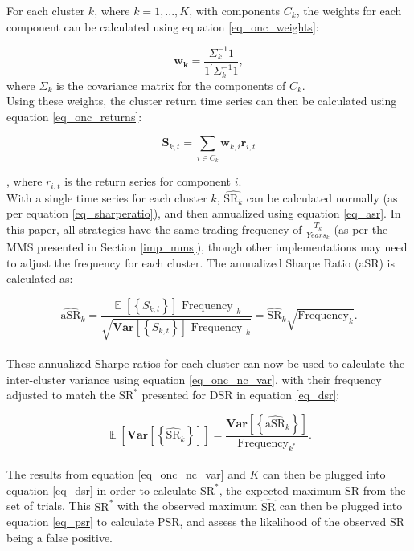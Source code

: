 \documentclass[a4paper,11pt,oneside]{article}
\newcommand{\Var}{\mathbf{Var}}
\DeclareMathOperator*{\E}{\mathbb{E}}
\theoremstyle{plain}
\theoremstyle{definition}
\begin{document}
	For each cluster $k$, where $k = 1, ..., K$, with components $C_k$, the weights for each component can be calculated using equation \eqref{eq_onc_weights}:
	
	\begin{equation}\label{eq_onc_weights}
	\mathbf{w_{k}}=\frac{\Sigma_{k}^{-1} 1}{1^{\prime} \Sigma_{k}^{-1} 1}, 
	\end{equation}
		where $\Sigma_k$ is the covariance matrix for the components of $C_k$.\newline
	~\\
	Using these weights, the cluster return time series can then be calculated using equation \eqref{eq_onc_returns}:
	
	\begin{equation}\label{eq_onc_returns}
	\mathbf{S}_{k, t}=\sum_{i \in C_{k}} \mathbf{w}_{k, i} \mathbf{r}_{i, t}
	\end{equation}

	, where $r_{i,t}$ is the return series for component $i$.\newline
	~\\
	With a single time series for each cluster $k$, $\widehat{\mathrm{SR}_k}$ can be calculated normally (as per equation \eqref{eq_sharperatio}), and then annualized using equation \eqref{eq_asr}. In this paper, all strategies have the same trading frequency of $\frac{T_k}{Years_k}$ (as per the MMS presented in Section \ref{imp_mms}), though other implementations may need to adjust the frequency for each cluster. The annualized Sharpe Ratio (aSR) is calculated as:
		
	\begin{equation}\label{eq_asr}
	\widehat{\mathrm{aSR}}_{k}=\frac{\mathrm{\E}\left[\left\{S_{k, t}\right\}\right] \text { Frequency }_{k}}{\sqrt{\mathrm{\Var}\left[\left\{S_{k, t}\right\}\right] \text { Frequency }_{k}}}=\widehat{\mathrm{SR}}_{k} \sqrt{\text {Frequency}_{k}} .
	\end{equation}
	~\\
	These annualized Sharpe ratios for each cluster can now be used to calculate the inter-cluster variance using equation \eqref{eq_onc_nc_var}, with their frequency adjusted to match the $\mathrm{SR}^*$ presented for DSR in equation \eqref{eq_dsr}:
		
	\begin{equation}\label{eq_onc_nc_var}
	\mathrm{\E}\left[\mathrm{\Var}\left[\left\{\widehat{\mathrm{SR}}_{k}\right\}\right]\right]=\frac{\mathrm{\Var}\left[\left\{\widehat{\mathrm{aSR}}_{k}\right\}\right]}{\text {Frequency}_{k^{*}}} .
	\end{equation}
	~\\
	The results from equation \eqref{eq_onc_nc_var} and $K$ can then be plugged into equation \eqref{eq_dsr} in order to calculate $\mathrm{SR}^*$, the expected maximum SR from the set of trials. This $\mathrm{SR}^*$ with the observed maximum $\widehat{\mathrm{SR}}$ can then be plugged into equation \eqref{eq_psr} to calculate PSR, and assess the likelihood of the observed $\widehat{\mathrm{SR}}$ being a false positive.
		
\end{document}
